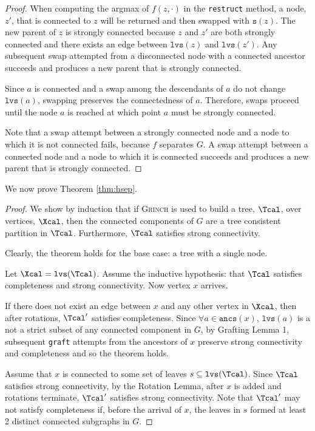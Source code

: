 \documentclass{article} \usepackage[utf8]{inputenc} \usepackage[T1]{fontenc}    \usepackage{hyperref}       \usepackage{url}            \usepackage{booktabs}       \usepackage{amsfonts}       \usepackage{nicefrac}       \usepackage{microtype}      \usepackage{geometry}
\newcommand{\alg}{\textsc{Grinch}\xspace}
\newcommand{\graft}{\texttt{graft}\xspace}
\newcommand{\rst}{\texttt{restruct}\xspace}
\newcommand{\lvs}[1]{\ensuremath{\texttt{lvs}(#1)}}
\newcommand{\ancs}[1]{\ensuremath{\texttt{ancs}(#1)}}
\newcommand{\sib}[1]{\ensuremath{\texttt{s}}(#1)\xspace}
\begin{document}
\begin{appendix}
\begin{proof}
When computing the argmax of $f(z, \cdot)$ in the \rst method, a node,
$z'$, that is connected to $z$ will be returned and then swapped with
$\sib{z}$. The new parent of $z$ is strongly connected because $z$ and
$z'$ are both strongly connected and there exists an edge between
\lvs{z} and \lvs{z'}. Any subsequent swap attempted from a
disconnected node with a connected ancestor succeeds and produces a
new parent that is strongly connected.

Since $a$ is connected and a swap among the descendants of
$a$ do not change $\lvs{a}$, swapping preserves the connectedness of
$a$. Therefore, swaps proceed until the node $a$ is reached at which
point $a$ must be strongly connected.

Note that a swap attempt between a strongly connected node and a node
to which it is not connected fails, because $f$ separates $G$.  A swap
attempt between a connected node and a node to which it is connected
succeeds and produces a new parent that is strongly connected.
\end{proof}

We now prove Theorem \ref{thm:hsep}.

\begin{proof}
We show by induction that if \alg is used to build a tree, $\Tcal$,
over vertices, $\Xcal$, then the connected components of $G$ are a
tree consistent partition in $\Tcal$. Furthermore, $\Tcal$ satisfies
strong connectivity.

Clearly, the theorem holds for the base case: a tree with a single
node.

Let $\Xcal = \lvs{\Tcal}$. Assume the inductive hypothesis: that
$\Tcal$ satisfies completeness and strong connectivity. Now vertex $x$
arrives.

If there does not exist an edge between $x$ and any other vertex in
$\Xcal$, then after rotations, $\Tcal'$ satisfies completeness. Since
$\forall a \in \ancs{x}$, \lvs{a} is a not a strict subset of any
connected component in $G$, by Grafting Lemma 1, subsequent \graft
attempts from the ancestors of $x$ preserve strong connectivity and
completeness and so the theorem holds.

Assume that $x$ is connected to some set of leaves $s \subseteq
\lvs{\Tcal}$.  Since $\Tcal$ satisfies strong connectivity, by the
Rotation Lemma, after $x$ is added and rotations terminate, $\Tcal'$
satisfies strong connectivity. Note that $\Tcal'$ may not satisfy
completeness if, before the arrival of $x$, the leaves in $s$ formed
at least 2 distinct connected subgraphs in $G$.


\end{proof}
\end{appendix}
\end{document}
